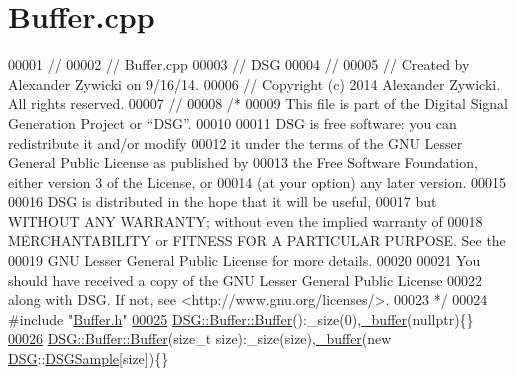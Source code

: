 \hypertarget{_buffer_8cpp_source}{\section{Buffer.\+cpp}
\label{_buffer_8cpp_source}
}

\begin{DoxyCode}
00001 \textcolor{comment}{//}
00002 \textcolor{comment}{//  Buffer.cpp}
00003 \textcolor{comment}{//  DSG}
00004 \textcolor{comment}{//}
00005 \textcolor{comment}{//  Created by Alexander Zywicki on 9/16/14.}
00006 \textcolor{comment}{//  Copyright (c) 2014 Alexander Zywicki. All rights reserved.}
00007 \textcolor{comment}{//}
00008 \textcolor{comment}{/*}
00009 \textcolor{comment}{ This file is part of the Digital Signal Generation Project or “DSG”.}
00010 \textcolor{comment}{}
00011 \textcolor{comment}{ DSG is free software: you can redistribute it and/or modify}
00012 \textcolor{comment}{ it under the terms of the GNU Lesser General Public License as published by}
00013 \textcolor{comment}{ the Free Software Foundation, either version 3 of the License, or}
00014 \textcolor{comment}{ (at your option) any later version.}
00015 \textcolor{comment}{}
00016 \textcolor{comment}{ DSG is distributed in the hope that it will be useful,}
00017 \textcolor{comment}{ but WITHOUT ANY WARRANTY; without even the implied warranty of}
00018 \textcolor{comment}{ MERCHANTABILITY or FITNESS FOR A PARTICULAR PURPOSE.  See the}
00019 \textcolor{comment}{ GNU Lesser General Public License for more details.}
00020 \textcolor{comment}{}
00021 \textcolor{comment}{ You should have received a copy of the GNU Lesser General Public License}
00022 \textcolor{comment}{ along with DSG.  If not, see <http://www.gnu.org/licenses/>.}
00023 \textcolor{comment}{ */}
00024 \textcolor{preprocessor}{#include "\hyperlink{_buffer_8h}{Buffer.h}"}
\hypertarget{_buffer_8cpp_source_l00025}{}\hyperlink{class_d_s_g_1_1_buffer_aa764dd8c389dcff51de08cb81fafeb86}{00025} \hyperlink{class_d_s_g_1_1_buffer_aa764dd8c389dcff51de08cb81fafeb86}{DSG::Buffer::Buffer}():\_size(0),\hyperlink{_driver_8cpp_acce4d24812914a6b276156d1a3d3e851}{\_buffer}(nullptr)\{\}
\hypertarget{_buffer_8cpp_source_l00026}{}\hyperlink{class_d_s_g_1_1_buffer_a0e6502fd61833043744f9df94e8d5111}{00026} \hyperlink{class_d_s_g_1_1_buffer_aa764dd8c389dcff51de08cb81fafeb86}{DSG::Buffer::Buffer}(\textcolor{keywordtype}{size\_t} size):\_size(size),\hyperlink{_driver_8cpp_acce4d24812914a6b276156d1a3d3e851}{\_buffer}(new 
      \hyperlink{namespace_d_s_g}{DSG}::\hyperlink{namespace_d_s_g_ac39a94cd27ebcd9c1e7502d0c624894a}{DSGSample}[size])\{\}

\end{DoxyCode}

